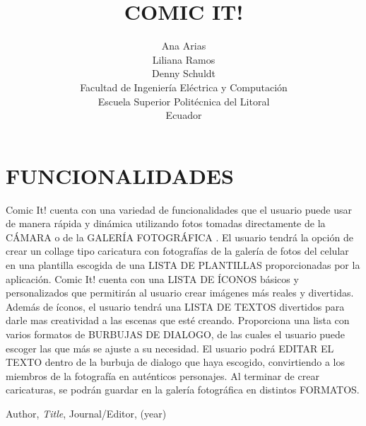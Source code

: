 \documentclass{article}
\title{COMIC IT!}
\author{Ana Arias\\Liliana Ramos\\Denny Schuldt\\
  \small Facultad de Ingeniería Eléctrica y Computación\\
  \small Escuela Superior Politécnica del Litoral\\
  \small Ecuador
}
\theoremstyle{definition}
\theoremstyle{remark}
\begin{document}
	\maketitle
		\section{FUNCIONALIDADES}
		Comic It! cuenta con una variedad de funcionalidades que el usuario puede usar de manera rápida y dinámica utilizando fotos tomadas directamente de la CÁMARA o de la GALERÍA FOTOGRÁFICA .
		El usuario tendrá la opción de crear un collage tipo caricatura  con fotografías de la galería de fotos del celular en una plantilla escogida de una LISTA DE PLANTILLAS proporcionadas por la aplicación.
		Comic It! cuenta con una LISTA DE ÍCONOS básicos y personalizados que permitirán al usuario crear imágenes más reales y divertidas.		
		Además de íconos, el usuario tendrá una LISTA DE TEXTOS divertidos para darle mas creatividad a las escenas que esté creando.
		Proporciona una lista con varios formatos de BURBUJAS DE DIALOGO, de las cuales el usuario puede escoger las que más se ajuste a su necesidad. El usuario podrá EDITAR EL TEXTO dentro de la burbuja de dialogo que haya escogido, convirtiendo a los miembros de 		la fotografía en auténticos personajes.
		Al terminar de crear caricaturas, se podrán guardar en la galería fotográfica en distintos FORMATOS.
					
		

\begin{thebibliography}{99}

 Author, \emph{Title}, Journal/Editor, (year)

\end{thebibliography}
\end{document}
